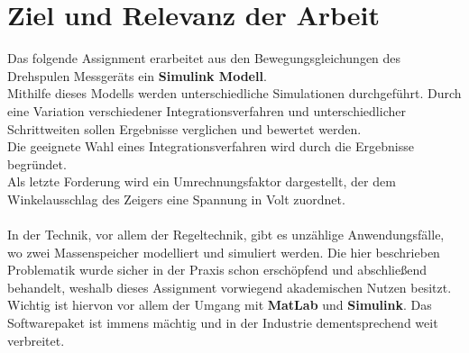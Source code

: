 \documentclass[12pt,a4paper]{scrartcl}	%
\begin{document}
\section{Ziel und Relevanz der Arbeit}
Das folgende Assignment erarbeitet aus den Bewegungsgleichungen des Drehspulen Messgeräts ein \textbf{Simulink Modell}.\\
Mithilfe dieses Modells werden unterschiedliche Simulationen durchgeführt. Durch eine Variation verschiedener Integrationsverfahren und unterschiedlicher Schrittweiten sollen Ergebnisse verglichen und bewertet werden.\\
Die geeignete Wahl eines Integrationsverfahren wird durch die Ergebnisse begründet.\\
Als letzte Forderung wird ein Umrechnungsfaktor dargestellt, der dem Winkelausschlag des Zeigers eine Spannung in Volt zuordnet.\\
\\
In der Technik, vor allem der Regeltechnik, gibt es unzählige Anwendungsfälle, wo zwei Massenspeicher modelliert und simuliert werden. Die hier beschrieben Problematik wurde sicher in der Praxis schon erschöpfend und abschließend behandelt, weshalb dieses Assignment vorwiegend akademischen Nutzen besitzt. Wichtig ist hiervon vor allem der Umgang mit \textbf{MatLab} und \textbf{Simulink}. Das Softwarepaket ist immens mächtig und in der Industrie dementsprechend weit verbreitet.
\end{document}
